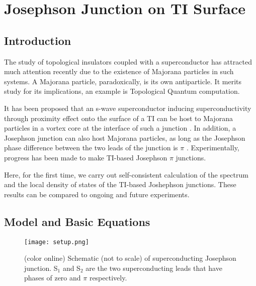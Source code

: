 \documentclass[11pt,revtex,aps]{report}
\begin{document}
\chapter{Josephson Junction on TI Surface}
\section{Introduction}
The study of topological insulators coupled with a superconductor has attracted much attention recently due to the existence of Majorana particles in such systems. A Majorana particle, paradoxically, is its own antiparticle. It merits study for its implications, an example is Topological Quantum computation.

It has been proposed that an s-wave superconductor inducing superconductivity through proximity effect onto the surface of a TI can be host to Majorana particles in a vortex core at the interface of such a junction \cite{f-k}. In addition, a Josephson junction can also host Majorana particles, as long as the Josephson phase difference between the two leads of the junction is $\pi$ \cite{josephson}. Experimentally, progress has been made to make TI-based Josephson $\pi$ junctions.

Here, for the first time, we carry out self-consistent calculation of the spectrum and the local density of states of the TI-based Joshephson junctions. These results can be compared to ongoing and future experiments. 
\section{Model and Basic Equations}

\begin{figure}
\center
\texttt{[image: setup.png]}
\caption{(color online) Schematic (not to scale) of superconducting Josephson junction. S$_1$ and S$_2$ are the two superconducting leads that have phases of zero and $\pi$ respectively. 
}\label{jjsetup}
\end{figure}
\end{document}
